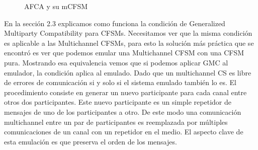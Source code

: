 \begin{figure}[ht]
\begin{example}
    \caption{AFCA y su mCFSM}
    \label{fig:mCFSM}

\end{example}
\end{figure}


En la sección 2.3 explicamos como funciona la condición de Generalized Multiparty Compatibility para CFSMs. Necesitamos ver que la misma condición es aplicable a las Multichannel CFSMs, para esto la solución más práctica que se encontró es ver que podemos emular una Multichannel CFSM con una CFSM pura. Mostrando esa equivalencia vemos que si podemos aplicar GMC al emulador, la condición aplica al emulado. Dado que un multichannel CS es libre de errores de comunicación si y solo si el sistema emulado también lo es. El procedimiento consiste en generar un nuevo participante para cada canal entre otros dos participantes. Este nuevo participante es un simple repetidor de mensajes de uno de los participantes a otro. De este modo una comunicación multichannel entre un par de participantes es reemplazada por múltiples comunicaciones de un canal con un repetidor en el medio. El aspecto clave de esta emulación es que preserva el orden de los mensajes.

